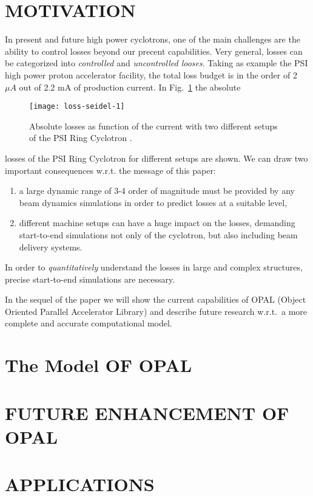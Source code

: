 \documentclass{JAC2003}
\begin{document}
\section{MOTIVATION}
In present and future high power cyclotrons, one of the main challenges are the ability to control losses beyond our precent capabilities. Very general, losses can be
categorized into {\em controlled} and {\em uncontrolled looses}. Taking as example the PSI high power proton accelerator facility,
the total loss budget is in the order of 2 $\mu A$ out of 2.2 mA of production current. In Fig.\ \ref{fig:loss1} the absolute
\begin{figure}[htb]
   \centering
   \texttt{[image: loss-seidel-1]}
   \caption{Absolute losses as function of  the current with two different setups of the PSI Ring Cyclotron \cite{pc-seidel}.}
   \label{fig:loss1}
\end{figure}
losses of the PSI Ring Cyclotron for different setups are shown. We can draw two important consequences w.r.t. the message
of this paper:
\begin{enumerate}
\item a large dynamic range of 3-4 order of magnitude must be provided by any
beam dynamics simulations in order to predict losses at a suitable level, 
\item different machine setups can have a huge impact on the losses, demanding start-to-end simulations not only of the cyclotron,  but also including beam delivery systems.
\end{enumerate}
In order to {\em quantitatively} understand the losses in large and complex structures, precise start-to-end simulations are necessary.

In the sequel of the paper we will show the current capabilities of OPAL (Object Oriented Parallel Accelerator Library) and describe future research w.r.t.\ a more
complete and accurate computational model. 
\section{The Model OF OPAL}


\section{FUTURE ENHANCEMENT OF OPAL}


\section{APPLICATIONS}
\end{document}
